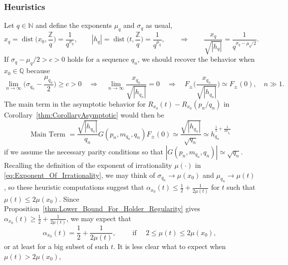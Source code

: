\documentclass[11pt,reqno]{amsart}
\theoremstyle{definition}
\begin{document}
\subsubsection{Heuristics}\label{sec:Heuristics}
Let $q \in \mathbb N$ and define the exponents $\mu_q$ and $\sigma_q$ as usual, 
\begin{equation}
x_q = \operatorname{dist} \Big( x_0, \frac{\mathbb Z}{ q} \Big) = \frac{1}{q^{\sigma_q}}, 
\qquad |h_q|  = \operatorname{dist} \Big( t, \frac{\mathbb Z}{ q} \Big) = \frac{1}{q^{\mu_q}}, 
\qquad \Longrightarrow \qquad 
\frac{x_q}{\sqrt{|h_q| }} = \frac{1}{q^{\sigma_q - \mu_q / 2}}. 
\end{equation}
If $\sigma_q - \mu_q/2 > c > 0$ holds for a sequence $q_n$, %
we should recover the behavior when $x_0 \in \mathbb Q$ because
\begin{equation}\label{eq:Heuristic_Argument_Of_F}
\lim_{n \to \infty} \big( \sigma_{q_n} - \frac{\mu_{q_n} }{2} \big) \geq c > 0 
\quad \Longrightarrow \quad 
\lim_{n \to \infty} \frac{x_{q_n}}{\sqrt{|h_{q_n}|}} = 0 
\quad \Longrightarrow \quad 
F_\pm\Big( \frac{x_{q_n}}{\sqrt{|h_{q_n}|}} \Big) \simeq F_\pm(0), \quad n \gg 1. 
\end{equation}
The main term in the asymptotic behavior for $R_{x_0} (t) - R_{x_0}(p_n/q_n)$
in Corollary~\ref{thm:CorollaryAsymptotic} would then be 
\begin{equation}
\text{ Main Term } = \frac{\sqrt{|h_{q_n}|}}{q_n} G(p_n,m_{q_n},q_n) F_\pm(0)
 \simeq \frac{\sqrt{|h_{q_n}|}}{\sqrt{q_n} }
 \simeq h_{q_n}^{\frac12 + \frac{1}{2\mu_{q_n}}}
\end{equation}
if we assume the necessary parity conditions so that $|G(p_n,m_{q_n},q_n)| \simeq \sqrt{q_n}$. 
Recalling the definition of the exponent of irrationality $\mu(\cdot)$ in  \eqref{eq:Exponent_Of_Irrationality},  
we may think of $\sigma_{q_n} \to \mu(x_0)$ and $\mu_{q_n} \to \mu(t)$, 
so these heuristic computations suggest that
$\alpha_{x_0}(t) \leq \frac12 + \frac{1}{2\mu(t)}$ for $t$ such that $\mu(t) \leq 2\mu(x_0)$. 
Since Proposition~\ref{thm:Lower_Bound_For_Holder_Regularity}
 gives $\alpha_{x_0}(t) \geq \frac12 + \frac{1}{2\mu(t)}$,
we may expect that
 \begin{equation}\label{eq:Heuristics_Irrationals}
 \alpha_{x_0}(t) = \frac12 + \frac{1}{2\mu(t)}, \qquad \text{ if } \quad 2 \leq \mu(t) \leq 2\mu(x_0),
 \end{equation}
or at least for a big subset of such $t$. 
 It is less clear what to expect when $\mu(t) > 2\mu(x_0)$, 
\end{document}
